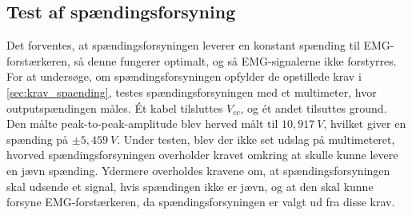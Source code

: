\subsection{Test af spændingsforsyning}

Det forventes, at spændingsforsyningen leverer en konstant spænding til EMG-forstærkeren, så denne fungerer optimalt, og så EMG-signalerne ikke forstyrres. For at undersøge, om spændingsforsyningen opfylder de opstillede krav i \ref{sec:krav_spaending}, testes spændingsforsyningen med et multimeter, hvor outputspændingen måles. Ét kabel tilsluttes $V_{cc}$, og ét andet tilsuttes ground. Den målte peak-to-peak-amplitude blev herved målt til $10,917~V$, hvilket giver en spænding på $\pm 5,459~V$. Under testen, blev der ikke set udslag på multimeteret, hvorved spændingsforsyningen overholder kravet omkring at skulle kunne levere en jævn spænding. 
Ydermere overholdes kravene om, at spændingsforsyningen skal udsende et signal, hvis spændingen ikke er jævn, og at den skal kunne forsyne EMG-forstærkeren, da spændingsforsyningen er valgt ud fra disse krav. 